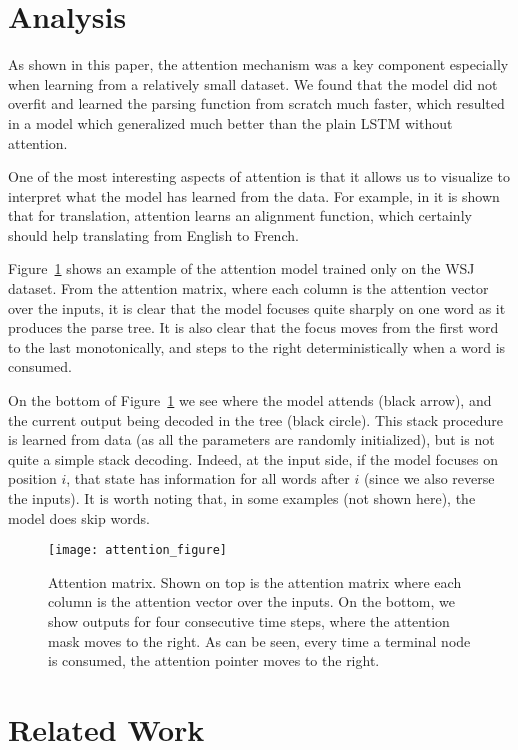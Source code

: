 \documentclass{article} \usepackage{nips15submit_e,times}
\begin{document}
\section{Analysis}
\label{sec:analysis}

As shown in this paper, the attention mechanism was a key component especially when learning from a relatively small dataset. We found that the model did not overfit and learned the parsing function from scratch much faster, which resulted in a model which generalized much better than the plain LSTM without attention.

One of the most interesting aspects of attention is that it allows us to visualize to interpret what the model has learned from the data. For example, in \cite{bahdanau2014neural} it is shown that for translation, attention learns an alignment function, which certainly should help translating from English to French.

Figure~\ref{fig:attention} shows an example of the attention model trained only on the WSJ dataset. From the attention matrix, where each column is the attention vector over the inputs, it is clear that the model focuses quite sharply on one word as it produces the parse tree. It is also clear that the focus moves from the first word to the last monotonically, and steps to the right deterministically when a word is consumed.

On the bottom of Figure~\ref{fig:attention} we see where the model attends (black arrow), and the current output being decoded in the tree (black circle). This stack procedure is learned from data (as all the parameters are randomly initialized), but is not quite a simple stack decoding. Indeed, at the input side, if the model focuses on position $i$, that state has information for all words after $i$ (since we also reverse the inputs). It is worth noting that, in some examples (not shown here), the model does skip words.

\begin{figure}[t]
\centering
\texttt{[image: attention\_figure]}
\caption{Attention matrix. Shown on top is the attention matrix where each column is the attention vector over the inputs. On the bottom, we show outputs for four consecutive time steps, where the attention mask moves to the right. As can be seen, every time a terminal node is consumed, the attention pointer moves to the right.}
\label{fig:attention}
\end{figure} \vspace{-0mm}
\section{Related Work}
\label{sec:rel}
\end{document}
